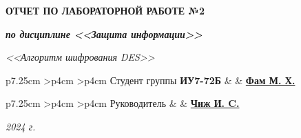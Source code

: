 \begin{titlepage}
\begin{center}
		\textbf{ОТЧЕТ ПО ЛАБОРАТОРНОЙ РАБОТЕ №2}
		
		\textbf{\textit{по дисциплине <<Защита информации>>}}
		
		\textit{\textit{<<Алгоритм шифрования DES>>}}
	\end{center}
	
	
	\vfill
	
	\begin{table}[h!]
		\fontsize{12pt}{0.7\baselineskip}\selectfont
		\centering
		\begin{signstabular}[0.7]{p{7.25cm} >{\centering\arraybackslash}p{4cm} >{\centering\arraybackslash}p{4cm}}
			Студент группы \textbf{ИУ7-72Б} & \uline{\mbox{\hspace*{4cm}}} & \uline{\hfill \textbf{Фам М. Х.} \hfill} \\
		\end{signstabular}
		
		\vspace{\baselineskip}
		
		\begin{signstabular}[0.7]{p{7.25cm} >{\centering\arraybackslash}p{4cm} >{\centering\arraybackslash}p{4cm}}
			Руководитель & \uline{\mbox{\hspace*{4cm}}} & \uline{\hfill \textbf{Чиж И. C.} \hfill} \\
		\end{signstabular}
	\end{table}
	
	\vfill
	
	\begin{center}
		\normalsize \textit{2024 г.}
	\end{center}
\end{titlepage}